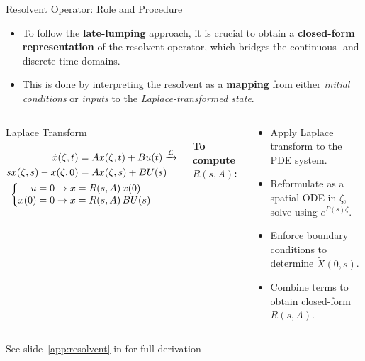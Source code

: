 \documentclass[8pt]{beamer}
\begin{document}
\begin{frame}{Resolvent Operator: Role and Procedure}
\begin{itemize}
    \item To follow the \textbf{late-lumping} approach, it is crucial to obtain a \textbf{closed-form representation} of the resolvent operator, which bridges the continuous- and discrete-time domains.
    \item This is done by interpreting the resolvent as a \textbf{mapping} from either \textit{initial conditions} or \textit{inputs} to the \textit{Laplace-transformed state}.
\end{itemize}

\begin{columns}[c]

\begin{block}{Laplace Transform}
\begin{small}
\begin{equation} \label{eq:resolvent}
\begin{aligned}
    \dot{x}(\zeta, t) &= A x(\zeta, t) + B u(t) \xrightarrow{\mathcal{L}}\\
    s x(\zeta,s) - x(\zeta,0) &= A x(\zeta,s) + B U(s)\\
    &\hspace{-7em}
    \begin{cases}
        \begin{aligned}
            u = 0 &\rightarrow x = {R}(s, A) \, x(0) \\
            x(0) = 0 &\rightarrow x = {R}(s, A) \, B U(s)
        \end{aligned}
    \end{cases}
\end{aligned}
\end{equation}
\end{small}
\end{block}


\vspace{6mm}\\
\textbf{To compute \({R}(s, A)\):}
\begin{small}
\begin{itemize}\setlength\itemsep{4pt}
    \item Apply Laplace transform to the PDE system.
    \item Reformulate as a spatial ODE in \(\zeta\), solve using \(e^{P(s)\zeta}\).
    \item Enforce boundary conditions to determine \(\tilde{X}(0,s)\).
    \item Combine terms to obtain closed-form \({R}(s, A)\).
\end{itemize}
\end{small}
\end{columns}
\begin{center}
    \small See slide~\ref{app:resolvent} in  for full derivation
\end{center}
\end{frame}
\end{document}
